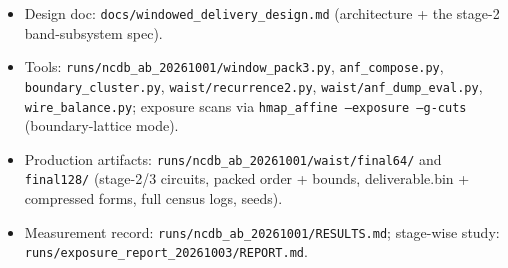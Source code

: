 \documentclass[11pt]{article}
\newcommand{\code}[1]{\texttt{#1}}
\begin{document}
\begin{itemize}
\item Design doc: \code{docs/windowed\_delivery\_design.md} (architecture +
  the stage-2 band-subsystem spec).
\item Tools: \code{runs/ncdb\_ab\_20261001/window\_pack3.py},
  \code{anf\_compose.py}, \code{boundary\_cluster.py},
  \code{waist/recurrence2.py}, \code{waist/anf\_dump\_eval.py},
  \code{wire\_balance.py}; exposure scans via \code{hmap\_affine --exposure
  --g-cuts} (boundary-lattice mode).
\item Production artifacts:
  \code{runs/ncdb\_ab\_20261001/waist/\allowbreak final64/} and
  \code{final128/} (stage-2/3 circuits, packed order + bounds,
  deliverable.bin + compressed forms, full census logs, seeds).
\item Measurement record: \code{runs/ncdb\_ab\_20261001/}\allowbreak\code{RESULTS.md};
  stage-wise study:\\ \code{runs/exposure\_report\_20261003/REPORT.md}.
\end{itemize}
\end{document}
